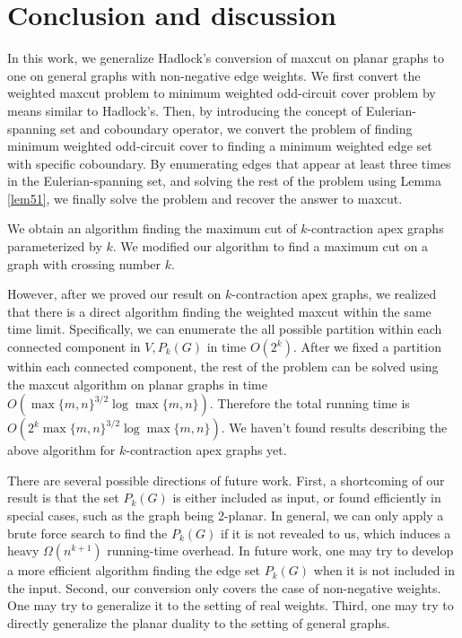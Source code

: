 \documentclass[10pt,fleqn]{article}
\begin{document}
	\section{Conclusion and discussion}
	In this work, we generalize Hadlock's conversion of maxcut on planar graphs to one on general graphs with non-negative edge weights. We first convert the weighted maxcut problem to minimum weighted odd-circuit cover problem by means similar to Hadlock's. Then, by introducing the concept of Eulerian-spanning set and coboundary operator, we convert the problem of finding minimum weighted odd-circuit cover to finding a minimum weighted edge set with specific coboundary. By enumerating edges that appear at least three times in the Eulerian-spanning set, and solving the rest of the problem using Lemma \ref{lem51}, we finally solve the problem and recover the answer to maxcut. \par
	We obtain an algorithm finding the maximum cut of $k$-contraction apex graphs parameterized by $k$. We modified our algorithm to find a maximum cut on a graph with crossing number $k$. \par
	However, after we proved our result on $k$-contraction apex graphs, we realized that there is a direct algorithm finding the weighted maxcut within the same time limit. Specifically, we can enumerate the all possible partition within each connected component in $V,P_k(G)$ in time $O(2^k)$. After we fixed a partition within each connected component, the rest of the problem can be solved using the maxcut algorithm on planar graphs in time $O(\max\{m,n\}^{3/2}\log\max\{m,n\})$. Therefore the total running time is $O(2^k\max\{m,n\}^{3/2}\log\max\{m,n\})$. We haven't found results describing the above algorithm for $k$-contraction apex graphs yet. \par
	There are several possible directions of future work. First, a shortcoming of our result is that the set $P_k(G)$ is either included as input, or found efficiently in special cases, such as the graph being 2-planar. In general, we can only apply a brute force search to find the $P_k(G)$ if it is not revealed to us, which induces a heavy $\Omega(n^{k+1})$ running-time overhead. In future work, one may try to develop a more efficient algorithm finding the edge set $P_k(G)$ when it is not included in the input. Second, our conversion only covers the case of non-negative weights. One may try to generalize it to the setting of real weights. Third, one may try to directly generalize the planar duality to the setting of general graphs.
	
\end{document}
